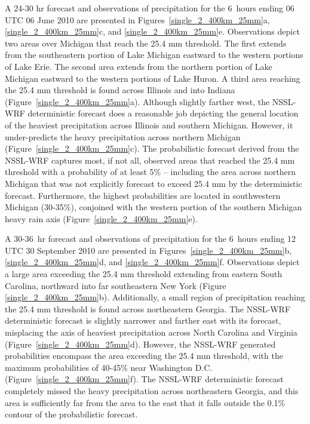 A 24-30 hr forecast and observations of precipitation for the \mbox{6 hours} ending 06 UTC 06 June 2010 are presented in \mbox{Figures \ref{single_2_400km_25mm}a}, \mbox{\ref{single_2_400km_25mm}c}, and \mbox{\ref{single_2_400km_25mm}e}.
Observations depict two areas over Michigan that reach the 25.4 mm threshold.
The first extends from the southeastern portion of Lake Michigan eastward to the western portions of Lake Erie.
The second area extends from the northern portion of Lake Michigan eastward to the western portions of Lake Huron.
A third area reaching the 25.4 mm threshold is found across Illinois and into Indiana \mbox{(Figure \ref{single_2_400km_25mm}a)}.
Although slightly farther west, the NSSL-WRF deterministic forecast does a reasonable job depicting the general location of the heaviest precipitation across Illinois and southern Michigan.
However, it under-predicts the heavy precipitation across northern Michigan \mbox{(Figure \ref{single_2_400km_25mm}c)}.
The probabilistic forecast derived from the NSSL-WRF captures most, if not all, observed areas that reached the 25.4 mm threshold with a probability of at least 5\% -- including the area across northern Michigan that was not explicitly forecast to exceed 25.4 mm by the deterministic forecast.
Furthermore, the highest probabilities are located in southwestern Michigan (30-35\%), conjoined with the western portion of the southern Michigan heavy rain axis \mbox{(Figure \ref{single_2_400km_25mm}e)}.


A \mbox{30-36 hr} forecast and observations of precipitation for the \mbox{6 hours} ending 12 UTC 30 September 2010 are presented in \mbox{Figures \ref{single_2_400km_25mm}b}, \mbox{\ref{single_2_400km_25mm}d}, and \mbox{\ref{single_2_400km_25mm}f}.
Observations depict a large area exceeding the 25.4 mm threshold extending from eastern South Carolina, northward into far southeastern New York (Figure \mbox{\ref{single_2_400km_25mm}b)}.
Additionally, a small region of precipitation reaching the 25.4 mm threshold is found across northeastern Georgia.
The NSSL-WRF deterministic forecast is slightly narrower and farther east with its forecast, misplacing the axis of heaviest precipitation across North Carolina and Virginia \mbox{(Figure \ref{single_2_400km_25mm}d)}.
However, the NSSL-WRF generated probabilities encompass the area exceeding the 25.4 mm threshold, with the maximum probabilities of 40-45\% near Washington D.C. \mbox{(Figure \ref{single_2_400km_25mm}f)}.
The NSSL-WRF deterministic forecast completely missed the heavy precipitation across northeastern Georgia, and this area is sufficiently far from the area to the east that it falls outside the 0.1\% contour of the probabilistic forecast.


